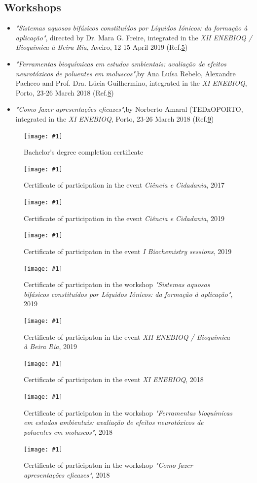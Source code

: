 \documentclass{article}
\newcommand{\attach}[3]{
\clearpage
\begin{figure}[b]
	\texttt{[image: \#1]}
	\centering
    \caption{#2}
    \label{#3}
 
\end{figure}
}
\begin{document}
\subsection{Workshops}
\begin{itemize}
\item \textit{"Sistemas aquosos bifásicos constituídos por Líquidos Iónicos: da formação à aplicação"}, directed by Dr. Mara G. Freire, integrated in the \textit{XII ENEBIOQ / Bioquímica à Beira Ria}, Aveiro, 12-15 April 2019 (Ref.\ref{ENEBIOQW2019})
\item \textit{"Ferramentas bioquímicas em estudos ambientais: avaliação de efeitos neurotóxicos de poluentes em moluscos"},by Ana Luísa Rebelo, Alexandre Pacheco and Prof. Dra. Lúcia Guilhermino, integrated in the \textit{XI ENEBIOQ}, Porto, 23-26 March 2018 (Ref.\ref{ENEBIOQW12018})
\item \textit{"Como fazer apresentações eficazes"},by Norberto Amaral (TEDxOPORTO, integrated in the \textit{XI ENEBIOQ}, Porto, 23-26 March 2018 (Ref.\ref{ENEBIOQW22018})
\end{itemize}



\listoffigures

\attach{attachments/certidão_licenciatura.jpg}{Bachelor's degree completion certificate}{Cert}
\attach{attachments/Ciência_e_cidadania_2017 003.jpg}{Certificate of participation in the event \textit{Ciência e Cidadania}, 2017}{CienciaCidad2017}
\attach{attachments/Ciência_e_cidadania_2019 001.jpg}{Certificate of participation in the event \textit{Ciência e Cidadania}, 2019}{CienciaCidad2019}
\attach{attachments/I_Biochemistry_sessions_2019.jpg}{Certificate of participaton in the event \textit{I Biochemistry sessions}, 2019}{BioSess2019}
\attach{attachments/XIIENEBIOQ_workshops_2019.jpg}{Certificate of participaton in the workshop \textit{"Sistemas aquosos bifásicos constituídos por Líquidos Iónicos: da formação à aplicação"}, 2019}{ENEBIOQW2019}
\attach{attachments/XIIENEBIOQ_2019.jpg}{Certificate of participaton in the event \textit{XII ENEBIOQ / Bioquímica à Beira Ria}, 2019}{ENEBIOQ2019}
\attach{attachments/XIENEBIOQ_2018.jpg}{Certificate of participaton in the event \textit{XI ENEBIOQ}, 2018}{ENEBIOQ2018}
\attach{attachments/XIENEBIOQ_workshop1_2018.jpg}{Certificate of participaton in the workshop \textit{"Ferramentas bioquímicas em estudos ambientais: avaliação de efeitos neurotóxicos de poluentes em moluscos"}, 2018}{ENEBIOQW12018}
\attach{attachments/XIENEBIOQ_workshop2_2018.jpg}{Certificate of participaton in the workshop \textit{"Como fazer apresentações eficazes"}, 2018}{ENEBIOQW22018}
\end{document}
